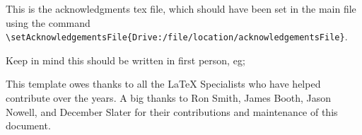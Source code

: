 This is the acknowledgments tex file, which should have been set in the main file using the command \verb|\setAcknowledgementsFile{Drive:/file/location/acknowledgementsFile}|.

Keep in mind this should be written in first person, eg;

This template owes thanks to all the LaTeX Specialists who have helped contribute over the years. A big thanks to Ron Smith, James Booth, Jason Nowell, and December Slater for their contributions and maintenance of this document.  